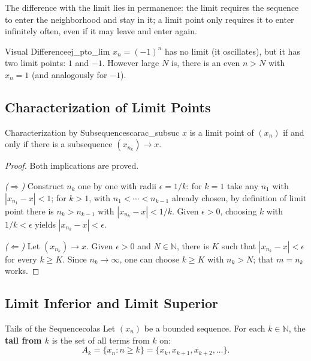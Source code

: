 \documentclass[11pt, a4paper]{article}
\begin{document}
The difference with the limit lies in permanence: the limit requires the sequence to enter the
neighborhood and stay in it; a limit point only requires it to enter infinitely often, even if it may
leave and enter again.

\begin{ejemplo}{Visual Difference}{ej_pto_lim}
$x_n = (-1)^n$ has no limit (it oscillates), but it has two limit points: $1$ and $-1$. However large
$N$ is, there is an even $n > N$ with $x_n = 1$ (and analogously for $-1$).
\end{ejemplo}

\subsection{Characterization of Limit Points}

\begin{teorema}{Characterization by Subsequences}{carac_subsuc}
$x$ is a limit point of $(x_n)$ if and only if there is a subsequence $(x_{n_k}) \to x$.
\end{teorema}

\begin{proof}
Both implications are proved.

\textit{($\Rightarrow$)} Construct $n_k$ one by one with radii $\epsilon = 1/k$: for $k=1$ take
any $n_1$ with $|x_{n_1} - x| < 1$; for $k > 1$, with $n_1 < \cdots < n_{k-1}$ already chosen, by
definition of limit point there is $n_k > n_{k-1}$ with $|x_{n_k} - x| < 1/k$. Given $\epsilon > 0$,
choosing $k$ with $1/k < \epsilon$ yields $|x_{n_k} - x| < \epsilon$.

\textit{($\Leftarrow$)} Let $(x_{n_k}) \to x$. Given $\epsilon > 0$ and $N \in \mathbb{N}$, there is $K$ such that
$|x_{n_k} - x| < \epsilon$ for every $k \ge K$. Since $n_k \to \infty$, one can choose $k \ge K$ with
$n_k > N$; that $m = n_k$ works.
\end{proof}

\subsection{Limit Inferior and Limit Superior}

\begin{definicion}{Tails of the Sequence}{colas}
Let $(x_n)$ be a bounded sequence. For each $k \in \mathbb{N}$, the \textbf{tail from $k$} is the
set of all terms from $k$ on:
$$ A_k = \{ x_n : n \ge k \} = \{ x_k, x_{k+1}, x_{k+2}, \dots \}. $$
\end{definicion}
\end{document}
